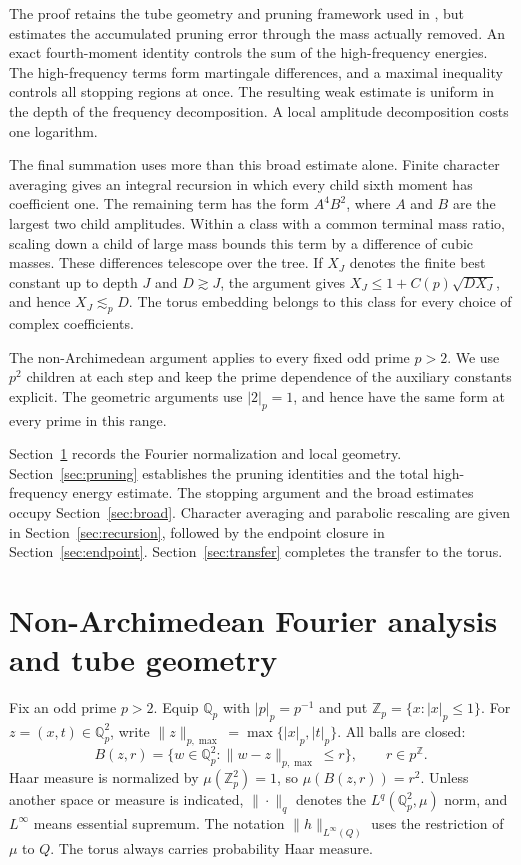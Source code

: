 \documentclass[11pt,twoside,a4paper]{article}
\numberwithin{equation}{section}
\theoremstyle{definition}
\newcommand{\Q}{\mathbb Q_p}
\newcommand{\Z}{\mathbb Z_p}
\begin{document}
The proof retains the tube geometry and pruning framework used in \cite{GLY}, but estimates the accumulated pruning error through the mass actually removed. An exact fourth-moment identity controls the sum of the high-frequency energies. The high-frequency terms form martingale differences, and a maximal inequality controls all stopping regions at once. The resulting weak estimate is uniform in the depth of the frequency decomposition. A local amplitude decomposition costs one logarithm.

The final summation uses more than this broad estimate alone. Finite character averaging gives an integral recursion in which every child sixth moment has coefficient one. The remaining term has the form $A^4B^2$, where $A$ and $B$ are the largest two child amplitudes. Within a class with a common terminal mass ratio, scaling down a child of large mass bounds this term by a difference of cubic masses. These differences telescope over the tree. If $X_J$ denotes the finite best constant up to depth $J$ and $D\gtrsim J$, the argument gives $X_J\le1+C(p)\sqrt{DX_J}$, and hence $X_J\lesssim_p D$. The torus embedding belongs to this class for every choice of complex coefficients.

The non-Archimedean argument applies to every fixed odd prime $p>2$. We use $p^2$ children at each step and keep the prime dependence of the auxiliary constants explicit. The geometric arguments use $|2|_p=1$, and hence have the same form at every prime in this range.

Section~\ref{sec:geometry} records the Fourier normalization and local geometry. Section~\ref{sec:pruning} establishes the pruning identities and the total high-frequency energy estimate. The stopping argument and the broad estimates occupy Section~\ref{sec:broad}. Character averaging and parabolic rescaling are given in Section~\ref{sec:recursion}, followed by the endpoint closure in Section~\ref{sec:endpoint}. Section~\ref{sec:transfer} completes the transfer to the torus.

\section{Non-Archimedean Fourier analysis and tube geometry}\label{sec:geometry}
Fix an odd prime $p>2$. Equip $\Q$ with $|p|_p=p^{-1}$ and put $\Z=\{x:|x|_p\le1\}$. For $z=(x,t)\in\Q^2$, write $\|z\|_{p,\max}=\max\{|x|_p,|t|_p\}$. All balls are closed:
$$
B(z,r)=\{w\in\Q^2:\|w-z\|_{p,\max}\le r\},
\qquad r\in p^{\mathbb Z}.
$$
Haar measure is normalized by $\mu(\Z^2)=1$, so $\mu(B(z,r))=r^2$. Unless another space or measure is indicated, $\|\cdot\|_q$ denotes the $L^q(\Q^2,\mu)$ norm, and $L^\infty$ means essential supremum. The notation $\|h\|_{L^\infty(Q)}$ uses the restriction of $\mu$ to $Q$. The torus always carries probability Haar measure.
\end{document}
